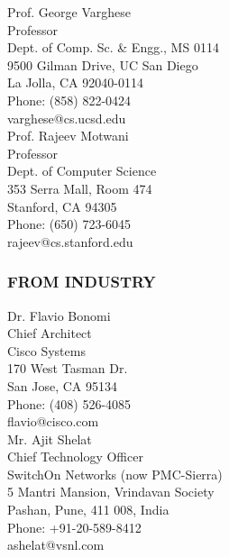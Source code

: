 \documentclass[10pt,a4]{article}
\begin{document}
\begin{small}
\begin{footnotesize}
\begin{multicols}{2}
\columnbreak

\noindent
Prof. George Varghese\\
Professor \\
Dept. of Comp. Sc. \& Engg., MS 0114 \\
9500 Gilman Drive, UC San Diego \\
La Jolla, CA 92040-0114 \\
Phone: (858) 822-0424 \\
varghese@cs.ucsd.edu \\


\noindent
Prof. Rajeev Motwani \\
Professor \\
Dept. of Computer Science  \\
353 Serra Mall, Room 474 \\
Stanford, CA 94305 \\
Phone: (650) 723-6045 \\
rajeev@cs.stanford.edu \\

\end{multicols}

\subsubsection*{FROM INDUSTRY}
\begin{multicols}{2} 

\noindent
Dr. Flavio Bonomi\\
Chief Architect \\
Cisco Systems \\
170 West Tasman Dr. \\
San Jose, CA 95134 \\
Phone: (408) 526-4085 \\
flavio@cisco.com \\

\columnbreak
\noindent
Mr. Ajit Shelat \\
Chief Technology Officer \\
SwitchOn Networks (now PMC-Sierra) \\
5 Mantri Mansion, Vrindavan Society \\
Pashan, Pune, 411 008, India \\
Phone: +91-20-589-8412 \\
ashelat@vsnl.com\\

\end{multicols}

\end{footnotesize}
\end{small}
\end{document}

